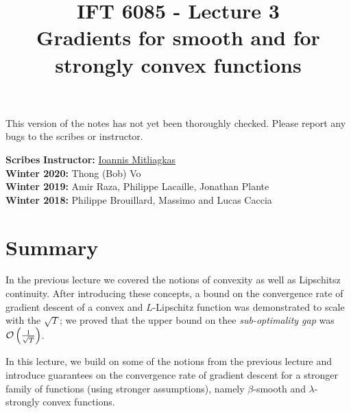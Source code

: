 \documentclass{article}
\title{IFT 6085 - Lecture 3 \\ 
Gradients for smooth and for strongly convex functions}
\date{}
\begin{document}
 

\maketitle

\vspace{-0.5in}
\begin{center}
This version of the notes has not yet been thoroughly checked.
Please report any bugs to the scribes or instructor.
\end{center}
\vspace{0.2in}

\textbf{Scribes}\hfill
\textbf{Instructor:}  {\href{https://mitliagkas.github.io/}{Ioannis Mitliagkas}}\\
\textbf{Winter 2020:} Thong (Bob) Vo\\
\textbf{Winter 2019:} Amir Raza, Philippe Lacaille, Jonathan Plante\\
\textbf{Winter 2018:} Philippe Brouillard, Massimo and Lucas Caccia



\newcommand{\infgc}{\inf_{g \in \mathcal{C}}}
\newcommand{\supgc}{\sup_{g \in \mathcal{C}}}

\newcommand{\Prob}{\mathbb{P}}
\newcommand{\reals}{\mathbb{R}}

\section{Summary}

In the previous lecture we covered the notions of convexity as well as Lipschitsz continuity. 
After introducing these concepts, a bound on the convergence rate of gradient descent of a convex and $L$-Lipschitz function was demonstrated to scale with the $\sqrt{T}$; we proved that the upper bound on thee \emph{sub-optimality gap} was $\mathcal{O}\left(\frac{1}{\sqrt{T}}\right)$.

In this lecture, we build on some of the notions from the previous lecture and introduce guarantees on the convergence rate of gradient descent for a stronger family of functions (using stronger assumptions), namely $\beta$-smooth and $\lambda$-strongly convex functions.
\end{document}
